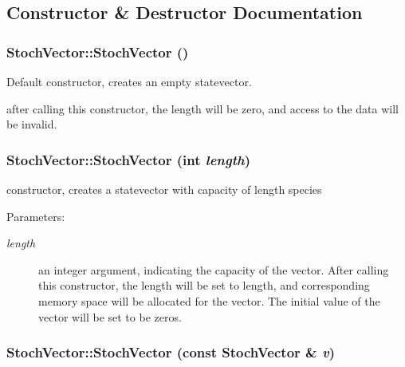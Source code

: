 \subsection{Constructor \& Destructor Documentation}
\hypertarget{class_stoch_vector_6911dc16546876d0038fa3931832f812}{
\subsubsection{\setlength{\rightskip}{0pt plus 5cm}StochVector::StochVector ()}}
\label{class_stoch_vector_6911dc16546876d0038fa3931832f812}


Default constructor, creates an empty statevector. 

after calling this constructor, the length will be zero, and access to the data will be invalid. \hypertarget{class_stoch_vector_e9a5e048a9d55ec742b3a5ec35756143}{
\subsubsection{\setlength{\rightskip}{0pt plus 5cm}StochVector::StochVector (int {\em length})}}
\label{class_stoch_vector_e9a5e048a9d55ec742b3a5ec35756143}


constructor, creates a statevector with capacity of length species 

\begin{Desc}
\item[Parameters:]
\begin{description}
\item[{\em length}]an integer argument, indicating the capacity of the vector. After calling this constructor, the length will be set to length, and corresponding memory space will be allocated for the vector. The initial value of the vector will be set to be zeros. \end{description}
\end{Desc}
\hypertarget{class_stoch_vector_42077b66e21408ccf8daebe6309c4020}{
\subsubsection{\setlength{\rightskip}{0pt plus 5cm}StochVector::StochVector (const {\bf StochVector} \& {\em v})}}
\label{class_stoch_vector_42077b66e21408ccf8daebe6309c4020}



